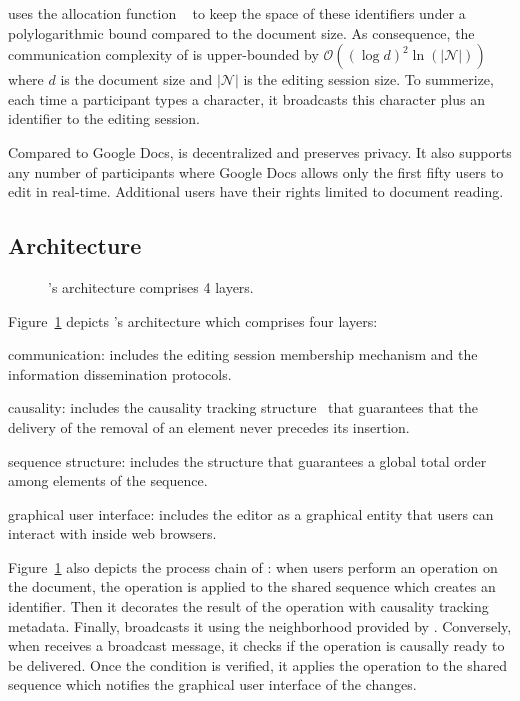 
\CRATE uses the allocation function \LSEQ~\cite{nedelec2013lseq} to
keep the space of these identifiers under a polylogarithmic bound
compared to the document size. As consequence, the communication
complexity of \CRATE is upper-bounded by
$\mathcal{O}((\log d)^2\ln(|\mathcal{N}|))$ where $d$ is the document
size and $|\mathcal{N}|$ is the editing session size. To summerize,
each time a participant types a character, it broadcasts this character
plus an identifier to the editing session.

Compared to Google Docs, \CRATE is decentralized and preserves
privacy. It also supports any number of participants where Google Docs
allows only the first fifty users to edit in real-time. Additional
users have their rights limited to document reading.

\subsection{Architecture}

\begin{figure}
  \centering
  
  \caption{\label{fig:architecture}\CRATE's architecture comprises 4
    layers.}
\end{figure}

Figure~\ref{fig:architecture} depicts \CRATE's architecture which comprises four
layers:
\begin{inparaenum}[(i)]
\item communication: includes the editing session membership mechanism and the
  information dissemination protocols.
\item causality: includes the causality tracking
  structure~\cite{malkhi2007concise} that guarantees that the delivery of the
  removal of an element never precedes its insertion.
\item sequence structure: includes the structure that guarantees a global
  total order among elements of the sequence.
\item graphical user interface: includes the editor as a graphical entity that
  users can interact with inside web browsers.
\end{inparaenum}
Figure~\ref{fig:architecture} also depicts the process chain of \CRATE: when
users perform an operation on the document, the operation is applied to the
shared sequence which creates an \LSEQ identifier. Then it decorates the result
of the operation with causality tracking metadata. Finally, \CRATE broadcasts it
using the neighborhood provided by \SPRAY.  Conversely, when \CRATE receives a
broadcast message, it checks if the operation is causally ready to be
delivered. Once the condition is verified, it applies the operation to the
shared sequence which notifies the graphical user interface of the changes.


